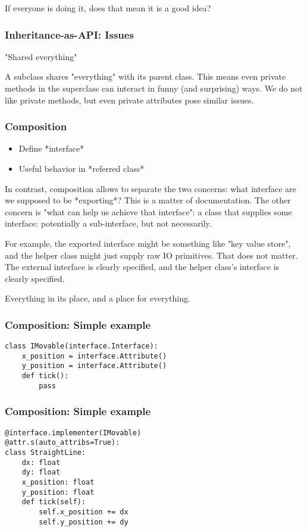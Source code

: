 If everyone is doing it,
does that mean it is a good idea?

\begin{frame}[fragile]
\frametitle{Inheritance-as-API: Issues}

"Shared everything"
\end{frame}

A subclass shares
"everything"
with its parent class.
This means even private methods in the superclass
can interact in funny
(and surprising)
ways.
We do not like private methods,
but even private attributes pose similar issues.

\begin{frame}[fragile]
\frametitle{Composition}

\begin{itemize}
\item Define *interface*
\item Useful behavior in *referred class*
\end{itemize}

\end{frame}

In contrast,
composition allows to separate the two concerns:
what interface are we supposed to be *exporting*?
This is a matter of documentation.
The other concern is
"what can help us achieve that interface":
a class that supplies some interface:
potentially a sub-interface,
but not necessarily.

For example,
the exported interface might be something like
"key value store",
and the helper class might just supply raw IO primitives.
That does not matter.
The external interface is clearly specified,
and the helper class's interface is clearly specified.

Everything in its place,
and a place for everything.

\begin{frame}[fragile]
\frametitle{Composition: Simple example}
\begin{lstlisting}
class IMovable(interface.Interface):
    x_position = interface.Attribute()
    y_position = interface.Attribute()
    def tick():
        pass
\end{lstlisting}

\end{frame}

\begin{frame}[fragile]
\frametitle{Composition: Simple example}
\begin{lstlisting}
@interface.implementer(IMovable)
@attr.s(auto_attribs=True):
class StraightLine:
    dx: float
    dy: float
    x_position: float
    y_position: float
    def tick(self):
        self.x_position += dx
        self.y_position += dy
\end{lstlisting}

\end{frame}

